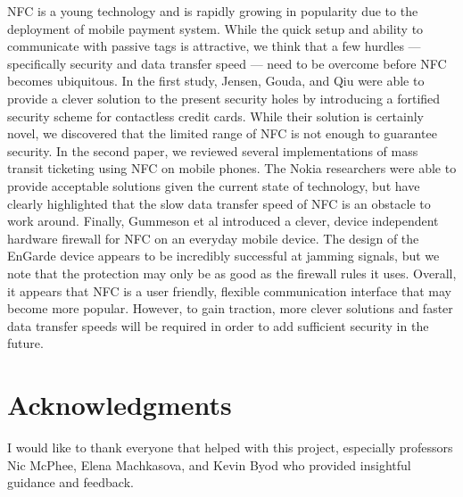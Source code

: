 \documentclass{sig-alternate}
\begin{document}
NFC is a young technology and is rapidly growing in popularity due to the deployment of mobile payment system. While the quick setup and ability to communicate with passive tags is attractive, we think that a few hurdles --- specifically security and data transfer speed --- need to be overcome before NFC becomes ubiquitous. In the first study, Jensen, Gouda, and Qiu were able to provide a clever solution to the present security holes by introducing a fortified security scheme for contactless credit cards. While their solution is certainly novel, we discovered that the limited range of NFC is not enough to guarantee security. In the second paper, we reviewed several implementations of mass transit ticketing using NFC on mobile phones. The Nokia researchers were able to provide acceptable solutions given the current state of technology, but have clearly highlighted that the slow data transfer speed of NFC is an obstacle to work around. Finally, Gummeson et al introduced a clever, device independent hardware firewall for NFC on an everyday mobile device. The design of the EnGarde device appears to be incredibly successful at jamming signals, but we note that the protection may only be as good as the firewall rules it uses. Overall, it appears that NFC is a user friendly, flexible communication interface that may become more popular. However, to gain traction, more clever solutions and faster data transfer speeds will be required in order to add sufficient security in the future.

\section*{Acknowledgments}
\label{sec:acknowledgments}

I would like to thank everyone that helped with this project, especially professors Nic McPhee, Elena Machkasova, and Kevin Byod who provided insightful guidance and feedback.



\end{document}
